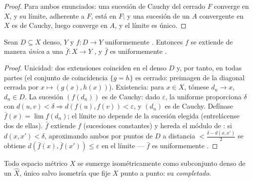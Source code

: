 \begin{proof}
Para ambos enunciados: una sucesión de Cauchy del cerrado $F$ converge
en $X$, y su límite, adherente a $F$, está en $F$; y una sucesión de un
 $A$ convergente en $X$ es de
Cauchy, luego converge en $A$, y el límite es único.
\end{proof}

\begin{theorem}
\label{thm:b3:complete:extension}
Sean $D \subseteq X$ denso, $Y$
 y $f \colon D \to
Y$ uniformemente . Entonces
$f$ se extiende de manera \emph{única} a una $\bar f \colon X \to Y$
, y $\bar f$ es
uniformemente
.
\end{theorem}

\begin{proof}
Unicidad: dos extensiones 
coinciden en el denso $D$ y, por tanto, en todas partes (el conjunto de
coincidencia $\{g = h\}$ es cerrado: preimagen de la diagonal cerrada
por $x\mapsto(g(x), h(x))$). Existencia: para $x \in X$, tómese
$d_n \to x$, $d_n \in D$. La sucesión $(f(d_n))$ es de Cauchy: dado
$\varepsilon$, la 
uniforme proporciona $\delta$ con $d(u,v) < \delta \Rightarrow
d(f(u), f(v)) < \varepsilon$, y $(d_n)$ es de Cauchy. Defínase
$\bar f(x) = \lim f(d_n)$; el límite no depende de la sucesión elegida
(entrelácense dos de ellas). $\bar f$ extiende $f$ (sucesiones
constantes) y hereda el módulo de
: si
$d(x, x') < \delta$, aproximando ambos por puntos de $D$ a distancia
$< \frac{\delta - d(x,x')}2$ se obtiene $d(\bar f(x), \bar
f(x')) \leq \varepsilon$ en el límite --- $\bar f$ es uniformemente
.
\end{proof}

\begin{theorem}[Completado]\label{thm:b3:complete:completion}
Todo espacio métrico $X$ se sumerge isométricamente como subconjunto
denso de un 
$\hat X$, único salvo isometría que fije $X$ punto a punto: su
\emph{completado}.
\end{theorem}

